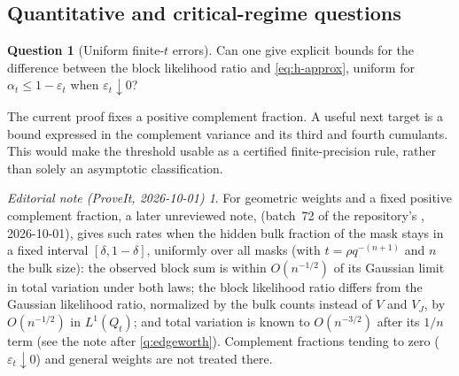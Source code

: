 \documentclass[11pt,a4paper]{article}
\numberwithin{equation}{section}
\theoremstyle{definition}
\newtheorem{question}[question]{Question}
\theoremstyle{remark}
\newtheorem*{ednotelater}{Editorial note (ProveIt, 2026-10-01)}
\newcommand{\Qt}{Q_t}
\begin{document}
\subsection{Quantitative and critical-regime questions}
\begin{question}[Uniform finite-$t$ errors]\label{q:rates}
Can one give explicit bounds for the difference between the block
likelihood ratio and \cref{eq:h-approx}, uniform for
$\alpha_t\le1-\varepsilon_t$ when $\varepsilon_t\downarrow0$?
\end{question}
The current proof fixes a positive complement fraction. A useful
next target is a bound expressed in the complement variance and
its third and fourth cumulants. This would make the threshold
usable as a certified finite-precision rule, rather than solely
an asymptotic classification.
\begin{ednotelater}
For geometric weights and a fixed positive complement fraction, a later
unreviewed note, 
(batch~72 of the repository's , 2026-10-01), gives such rates when the hidden
bulk fraction of the mask stays in a fixed interval $[\delta,1-\delta]$,
uniformly over all masks (with $t=\rho q^{-(n+1)}$ and $n$ the bulk size): the
observed block sum is within $O(n^{-1/2})$ of its Gaussian limit in total
variation under both laws; the block likelihood ratio differs from the
Gaussian likelihood ratio, normalized by the bulk counts instead of $V$ and
$V_J$, by $O(n^{-1/2})$ in $L^1(\Qt)$; and total variation is known to
$O(n^{-3/2})$ after its $1/n$ term (see the note after \cref{q:edgeworth}).
Complement fractions tending to zero ($\varepsilon_t\downarrow0$) and general
weights are not treated there.
\end{ednotelater}
\end{document}
